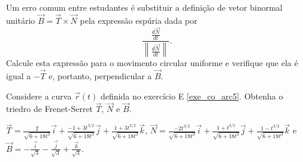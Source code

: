 \begin{exer} Um erro comum entre estudantes é substituir a definição de vetor binormal unitário $\vec{B}=\vec{T}\times\vec{N}$ pela expressão espúria dada por $$\frac{\frac{d\vec{N}}{dt}}{\left\|\frac{d\vec{N}}{dt}\right\|}.$$ Calcule esta expressão para o movimento circular uniforme e verifique que ela é igual a $-\vec{T}$ e, portanto, perpendicular a $\vec{B}$.
\end{exer}

\begin{exer}
  Considere a curva $\vec{r}(t)$ definida no exercício E \ref{exe_co_arc5}. Obtenha o triedro de Frenet-Serret $\vec{T}$, $\vec{N}$ e $\vec{B}$.
\end{exer}
\begin{resp}
  $\vec{T}=\frac{2}{\sqrt{6+18t^3}}\vec{i}+\frac{-1+3t^{3/2}}{\sqrt{6+18t^3}}\vec{j}+\frac{1+3t^{3/2}}{\sqrt{6+18t^3}}\vec{k}$, $\vec{N} = \frac{-2t^{3/2}}{\sqrt{6+18t^3}}\vec{i}+\frac{1+t^{3/2}}{\sqrt{6+18t^3}}\vec{j}+\frac{1-t^{3/2}}{\sqrt{6+18t^3}}\vec{k}$ e $\vec{B} = -\frac{\vec{i}}{\sqrt{3}} - \frac{\vec{j}}{\sqrt{3}} + \frac{\vec{k}}{\sqrt{3}}$.
\end{resp}


